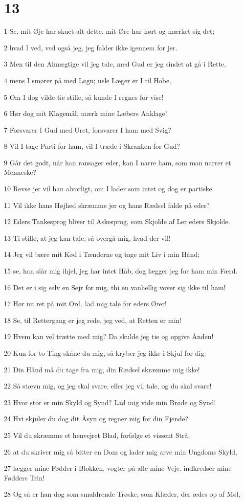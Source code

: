 \chapter{13}

\par 1 Se, mit Øje har skuet alt dette, mit Øre har hørt og mærket sig det;
\par 2 hvad I ved, ved også jeg, jeg falder ikke igennem for jer.
\par 3 Men til den Almægtige vil jeg tale, med Gud er jeg sindet at gå i Rette,
\par 4 mens I smører på med Løgn; usle Læger er I til Hobe.
\par 5 Om I dog vilde tie stille, så kunde I regnes for vise!
\par 6 Hør dog mit Klagemål, mærk mine Læbers Anklage!
\par 7 Forsvarer I Gud med Uret, forsvarer I ham med Svig?
\par 8 Vil I tage Parti for ham, vil I træde i Skranken for Gud?
\par 9 Går det godt, når han ransager eder, kan I narre ham, som man narrer et Menneske?
\par 10 Revse jer vil han alvorligt, om I lader som intet og dog er partiske.
\par 11 Vil ikke hans Højhed skræmme jer og hans Rædsel falde på eder?
\par 12 Eders Tankesprog bliver til Askesprog, som Skjolde af Ler eders Skjolde.
\par 13 Ti stille, at jeg kan tale, så overgå mig, hvad der vil!
\par 14 Jeg vil bære mit Kød i Tænderne og tage mit Liv i min Hånd;
\par 15 se, han slår mig ihjel, jeg har intet Håb, dog lægger jeg for ham min Færd.
\par 16 Det er i sig selv en Sejr for mig, thi en vanhellig vover sig ikke til ham!
\par 17 Hør nu ret på mit Ord, lad mig tale for eders Ører!
\par 18 Se, til Rettergang er jeg rede, jeg ved, at Retten er min!
\par 19 Hvem kan vel trætte med mig? Da skulde jeg tie og opgive Ånden!
\par 20 Kun for to Ting skåne du mig, så kryber jeg ikke i Skjul for dig:
\par 21 Din Hånd må du tage fra mig, din Rædsel skræmme mig ikke!
\par 22 Så stævn mig, og jeg skal svare, eller jeg vil tale, og du skal svare!
\par 23 Hvor stor er min Skyld og Synd? Lad mig vide min Brøde og Synd!
\par 24 Hvi skjuler du dog dit Åsyn og regner mig for din Fjende?
\par 25 Vil du skræmme et henvejret Blad, forfølge et vissent Strå,
\par 26 at du skriver mig så bitter en Dom og lader mig arve min Ungdoms Skyld,
\par 27 lægger mine Fødder i Blokken, vogter på alle mine Veje. indkredser mine Fødders Trin!
\par 28 Og så er han dog som smuldrende Trøske, som Klæder, der ædes op af Møl,

